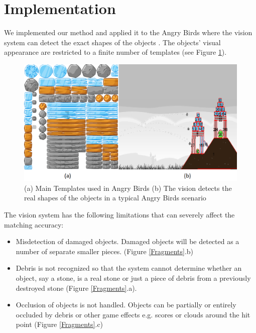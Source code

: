 \documentclass[letterpaper]{article}
\begin{document}
\section{Implementation}
We implemented our method and applied it to the Angry Birds where the vision system can detect the exact shapes of the objects \cite{andrewwang}. The objects' visual appearance are restricted to a finite number of templates (see Figure \ref{Templates}).  
\begin{figure}[t!]
\centering\includegraphics[scale=0.28]{Templates.png}\caption{(a) Main Templates used in Angry Birds (b) The vision detects the real shapes of the objects in a typical Angry Birds scenario}
\label{Templates}
\end{figure}
The vision system has the following limitations that can severely affect the matching accuracy: 
\begin{itemize}
\item Misdetection of damaged objects. Damaged objects will be detected as a number of separate smaller pieces. (Figure \ref{Fragments}.b) 
\item Debris is not recognized so that the system cannot determine whether an object, say a stone, is a real stone or just a piece of debris from a previously destroyed stone (Figure \ref{Fragments}.a).
\item Occlusion of objects is not handled. Objects can be partially or entirely occluded by debris or other game effects e.g. scores or clouds around the hit point (Figure \ref{Fragments}.c)
\end{itemize}
\end{document}
